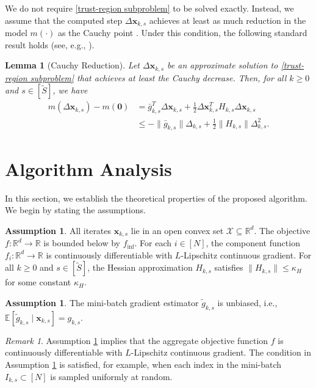 \documentclass{article}
\newcommand{\bx}{\boldsymbol{x}}
\newcommand{\barg}{\bar{g}}
\theoremstyle{plain}
\newtheorem{lemma}[theorem]{Lemma}
\theoremstyle{definition}
\newtheorem{assumption}[theorem]{Assumption}
\theoremstyle{remark}
\newtheorem{remark}[theorem]{Remark}
\begin{document}
We do not require \eqref{trust-region subproblem} to be solved exactly. Instead, we assume that the computed step $\Delta \bx_{k,s}$ achieves at least as much reduction in the model $m(\cdot)$ as the Cauchy point \citep[see][]{Nocedal2006Numerical}. Under this condition, the following standard result holds (see, e.g., \citealp{Curtis2022Fully,Fang2024Fully}).
\begin{lemma}[Cauchy Reduction]\label{lemma:Cauchy reduction}
Let $\Delta \bx_{k,s}$ be an approximate solution to \eqref{trust-region subproblem} that achieves at least the Cauchy decrease. Then, for all $k \ge 0$ and $s \in [\tilde{S}]$, we have
\vspace{-0.1cm}
\begin{align*}
m(\Delta \bx_{k,s}) - m(\boldsymbol{0})
&= \barg_{k,s}^T \Delta \bx_{k,s}
+ \frac{1}{2} \Delta \bx_{k,s}^T H_{k,s} \Delta \bx_{k,s} \\
&\le - \|\barg_{k,s}\| \Delta_{k,s}
+ \frac{1}{2} \|H_{k,s}\| \Delta_{k,s}^2.
\end{align*}
\end{lemma}






\section{Algorithm Analysis}\label{algo_analysis}

In this section, we establish the theoretical properties of the proposed algorithm. We begin by stating the assumptions.

\begin{assumption}\label{assump1}
All iterates $\bx_{k,s}$ lie in an open convex set $\mathcal{X} \subseteq \mathbb{R}^d$. The objective $f: \mathbb{R}^d \to \mathbb{R}$ is bounded below by $f_{\inf}$. For each $i \in [N]$, the component function $f_i : \mathbb{R}^d \to \mathbb{R}$ is continuously differentiable with $L$-Lipschitz continuous gradient. For all $k \geq 0$ and $s \in [\tilde{S}]$, the Hessian approximation $H_{k,s}$ satisfies $\|H_{k,s}\| \leq \kappa_H$ for some constant $\kappa_H$.
\end{assumption}

\begin{assumption}\label{assump2}
The mini-batch gradient estimator $\tilde{g}_{k,s}$ is unbiased, i.e.,
$\mathbb{E}[\tilde{g}_{k,s} \mid \bx_{k,s}] = g_{k,s}$.
\end{assumption}

\begin{remark}
Assumption \ref{assump1} implies that the aggregate objective function $f$ is continuously differentiable with $L$-Lipschitz continuous gradient. The condition in Assumption \ref{assump2} is satisfied, for example, when each index in the mini-batch $I_{k,s} \subset [N]$ is sampled uniformly at random.
\end{remark}
\end{document}
